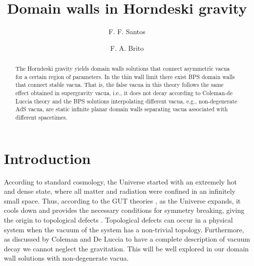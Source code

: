 \documentclass[aps,12pt, a4paper,nofootinbib]{revtex4}
\begin{document}
 

\title{Domain walls in Horndeski gravity}

\author{F. F. Santos}
 

\author{F. A. Brito}
 


\begin{abstract}
The Horndeski gravity yields domain walls solutions that connect asymmetric vacua for a certain region of parameters. In the thin wall limit there exist BPS domain walls that connect stable vacua. That is, the false vacua in this theory follows the same effect obtained in supergravity vacua, i.e., it does not decay according to Coleman-de Luccia theory and the BPS solutions interpolating different vacua, e.g., non-degenerate AdS vacua,  are static infinite planar domain walls separating vacua associated with different spacetimes.
\end{abstract}


\maketitle
\newpage


\newpage


\section{Introduction}

According to standard cosmology, the Universe started with an extremely hot and dense state, where all matter and radiation were confined in an infinitely small space. Thus, according to the GUT theories \cite{Nanopoulos:1978rk,Binetruy:1979hc}, as the Universe expands, it cools down and provides the necessary conditions for symmetry breaking, giving the origin to topological defects \cite{Basu:1993rf,Cvetic:1996vr,Dolgov:2016fnx,Dolgov:2017zjp}. Topological defects can occur in a physical system when the vacuum of the system has a non-trivial topology. Furthermore, as discussed by Coleman and De Luccia \cite{Coleman:1980aw} to have a complete description of vacuum decay we cannot neglect the gravitation. This will be well explored in our domain wall solutions with non-degenerate vacua. 
\end{document}
